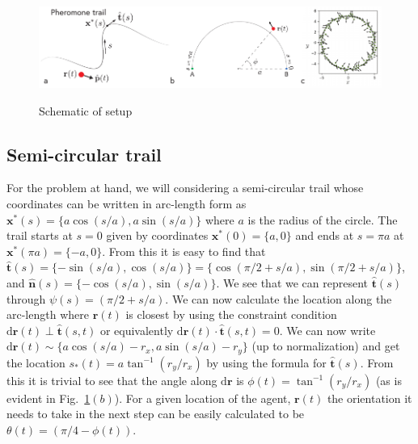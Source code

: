 \documentclass[12pt]{article}
\def\d{\text{d}}
\def\r{\mathbf{r}}
\def\xst{\mathbf{x}^*}
\def\th{\hat{\mathbf{t}}}
\def\nh{\hat{\mathbf{n}}}
\begin{document}
\begin{figure}
    \centering
    \includegraphics[width=\textwidth]{./figs/schematic.pdf}
    \label{fig:schm1}
    \caption{Schematic of setup}
\end{figure}

\subsection{Semi-circular trail}
For the problem at hand, we will considering a semi-circular trail whose coordinates can be
written in arc-length form as $\xst(s) = \{ a \cos(s/a), a \sin(s/a) \}$ where $a$ is the radius
of the circle. The trail starts at $s=0$ given by coordinates $\xst(0) = \{ a, 0 \}$ and ends at
$s=\pi a$ at $\xst (\pi a) = \{ -a, 0 \}$. From this it is easy to find that $\th(s) = \{ -\sin(s/a) , \cos(s/a) \}
= \{ \cos(\pi/2 + s/a), \sin(\pi/2 + s/a) \}$, and $\nh(s) = \{ -\cos(s/a) , \sin(s/a) \}$. We see that we
can represent $\th(s)$ through $\psi(s) = (\pi/2 + s/a)$. We can now calculate the location along the arc-length
where $\r(t)$ is closest by using the constraint condition $\d\r(t) \perp \th(s,t)$ or equivalently $\d\r(t)
\cdot \th(s,t) = 0$. We can now write $\d \r(t) \sim \{ a \cos(s/a) - r_x, a \sin(s/a) - r_y \}$
(up to normalization) and get the location $s_*(t) = a \tan^{-1}(r_y/r_x)$ by using the formula
for $\th(s)$. From this it is trivial to see that the angle along $\d \r$ is $\phi(t) = \tan^{-1}(r_y/r_x)$
(as is evident in Fig.~\ref{fig:schm1}$(b)$). For a given location of the agent, $\r(t)$ the orientation
it needs to take in the next step can be easily calculated to be $\theta(t) = (\pi/4 - \phi(t))$.
\end{document}
